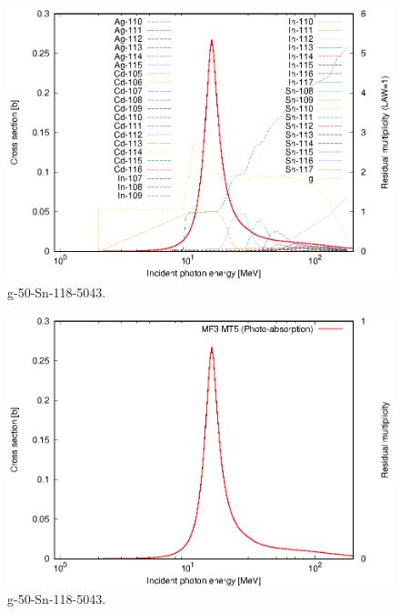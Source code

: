 \begin{figure}
 \includegraphics[width=\linewidth]{eps/g_50-Sn-118_5043.eps}
  \caption{g-50-Sn-118-5043.}
\end{figure}
\begin{figure}
 \includegraphics[width=\linewidth]{eps-law0/g_50-Sn-118_5043.eps}
 \caption{g-50-Sn-118-5043.}
\end{figure}
\newpage \clearpage


